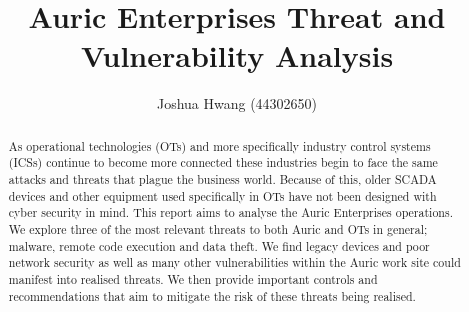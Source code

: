 \documentclass{article}
\title{Auric Enterprises Threat and Vulnerability Analysis}
\author{Joshua Hwang (44302650)}
\begin{document}
\maketitle
\begin{abstract}
    As operational technologies (OTs) and more specifically
    industry control systems (ICSs) continue to become more connected these
    industries begin to face the same attacks and threats
    that plague the business
    world.
    Because of this, older SCADA devices
    and other equipment used specifically in OTs have not been designed with
    cyber security in mind.
    This report aims to analyse the Auric Enterprises operations.
    We explore three of the most relevant threats to both Auric and OTs in
    general; malware, remote code execution and data theft.
    We find
    legacy devices and poor network security as well as many other
    vulnerabilities within the Auric work site could manifest into
    realised threats. We then provide important controls and
    recommendations that aim to mitigate the risk of these threats being
    realised.
\end{abstract}
\end{document}
